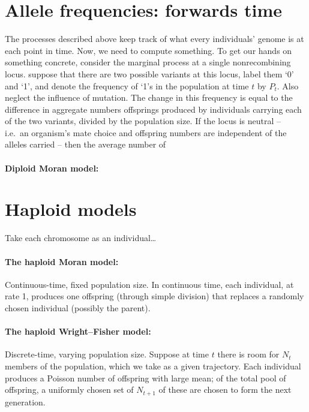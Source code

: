 \section{Allele frequencies: forwards time}

The processes described above keep track of what every individuals' genome is at each point in time.
Now, we need to compute something.
To get our hands on something concrete, consider the marginal process at a single nonrecombining locus.
suppose that there are two possible variants at this locus,
label them `0' and `1',
and denote the frequency of `1's in the population at time $t$ by $P_t$.
Also neglect the influence of mutation.
The change in this frequency is equal to the difference in aggregate numbers offsprings produced by individuals 
carrying each of the two variants,
divided by the population size.
If the locus is neutral
-- i.e.\ an organism's mate choice and offspring numbers are independent of the alleles carried --
then the average number of 

\paragraph{Diploid Moran model:}


\section{Haploid models}

Take each chromosome as an individual\ldots

\paragraph{The haploid Moran model:}
Continuous-time, fixed population size.
In continuous time, each individual, at rate 1, 
produces one offspring (through simple division)
that replaces a randomly chosen individual (possibly the parent).

\paragraph{The haploid Wright--Fisher model:}
Discrete-time, varying population size.
Suppose at time $t$ there is room for $N_t$ members of the population,
which we take as a given trajectory.
Each individual produces a Poisson number of offspring with large mean;
of the total pool of offspring, a uniformly chosen set of $N_{t+1}$ of these
are chosen to form the next generation.




